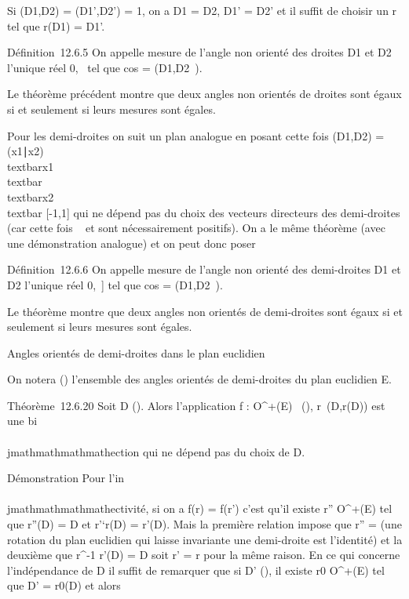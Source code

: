 Si \phi(D1,D2) = \phi(D1',D2') = 1, on
a D1 = D2, D1' = D2' et il
suffit de choisir un r tel que r(D1) = D1'.

Définition~12.6.5 On appelle mesure de l'angle non orienté des droites
D1 et D2 l'unique réel \theta \in {[}0,\pi~\diagup2{]} tel que
cos \theta = \phi(D1,D2~).

Le théorème précédent montre que deux angles non orientés de droites
sont égaux si et seulement si leurs mesures sont égales.

Pour les demi-droites on suit un plan analogue en posant cette fois
\phi(D1,D2) =
(x1∣x2)
\over
\\textbar{}x1\\textbar{}
\\textbar{}x2\\textbar{} \in
{[}-1,1{]} qui ne dépend pas du choix des vecteurs directeurs des
demi-droites (car cette fois \lambda~ et \mu sont nécessairement positifs). On a
le même théorème (avec une démonstration analogue) et on peut donc poser

Définition~12.6.6 On appelle mesure de l'angle non orienté des
demi-droites D1 et D2 l'unique réel \theta \in {[}0,\pi~{]}
tel que cos \theta = \phi(D1,D2~).

Le théorème montre que deux angles non orientés de demi-droites sont
égaux si et seulement si leurs mesures sont égales.

Angles orientés de demi-droites dans le plan euclidien

On notera \tildeA() l'ensemble des angles orientés
de demi-droites du plan euclidien E.

Théorème~12.6.20 Soit D \in\tildeD(). Alors
l'application f : O^+(E) \rightarrow~\tildeA(),
r\mapsto~\widehat(D,r(D)) est une
bi\\\\jmathmathmathmathection qui ne dépend pas du choix de D.

Démonstration Pour l'in\\\\jmathmathmathmathectivité, si on a f(r) = f(r') c'est qu'il
existe r'' \in O^+(E) tel que r''(D) = D et r'`\cdot r(D) = r'(D).
Mais la première relation impose que r'' = \mathrmId
(une rotation du plan euclidien qui laisse invariante une demi-droite
est l'identité) et la deuxième que r^-1 \cdot r'(D) = D soit r' =
r pour la même raison. En ce qui concerne l'indépendance de D il suffit
de remarquer que si D' \in\tildeD(), il existe
r0 \in O^+(E) tel que D' = r0(D) et alors

